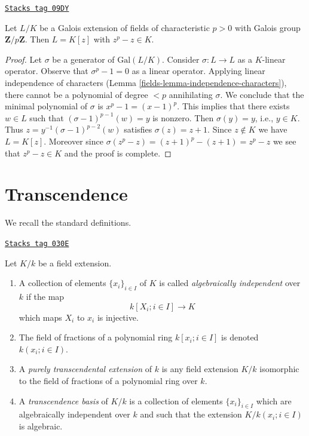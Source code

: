 \begin{lemma}

\label{fields-lemma-Artin-Schreier}
\href{https://stacks.math.columbia.edu/tag/09DY}{\texttt{Stacks tag 09DY}}

Let $L/K$ be a Galois extension of fields of characteristic $p > 0$
with Galois group $\mathbf{Z}/p\mathbf{Z}$. Then $L = K[z]$ with
$z^p - z \in K$.
\end{lemma}

\begin{proof}

Let $\sigma$ be a generator of $\text{Gal}(L/K)$.
Consider $\sigma : L \to L$ as a $K$-linear operator.
Observe that $\sigma^p - 1 = 0$ as a linear operator.
Applying linear independence of characters
(Lemma \ref{fields-lemma-independence-characters}),
there cannot be a polynomial of degree $< p$
annihilating $\sigma$. We conclude that the minimal
polynomial of $\sigma$ is $x^p - 1 = (x - 1)^p$.
This implies that there exists $w \in L$ such that
$(\sigma - 1)^{p - 1}(w) = y$ is nonzero. Then
$\sigma(y) = y$, i.e., $y \in K$. Thus
$z = y^{-1}(\sigma - 1)^{p - 2}(w)$ satisfies
$\sigma(z) = z + 1$. Since $z \not \in K$ we have $L = K[z]$.
Moreover since $\sigma(z^p - z) = (z + 1)^p - (z + 1) = z^p - z$
we see that $z^p - z \in K$ and the proof is complete.
\end{proof}

\section{Transcendence}
\label{fields-section-transcendence}
We recall the standard definitions.

\begin{definition}[Transcendence]
\label{fields-definition-transcendence}
\href{https://stacks.math.columbia.edu/tag/030E}{\texttt{Stacks tag 030E}}

Let $K/k$ be a field extension.
\begin{enumerate}
\item A collection of elements $\{x_i\}_{i \in I}$ of $K$ is called
{\it algebraically independent} over $k$ if the map
$$
k[X_i; i\in I] \longrightarrow K
$$
which maps $X_i$ to $x_i$ is injective.
\item The field of fractions of a polynomial ring
$k[x_i; i \in I]$ is denoted $k(x_i; i\in I)$.
\item A {\it purely transcendental extension} of $k$ is any
field extension $K/k$ isomorphic to the field of
fractions of a polynomial ring over $k$.
\item A {\it transcendence basis} of $K/k$ is a
collection of elements $\{x_i\}_{i \in I}$ which are
algebraically independent over $k$ and such that
the extension $K/k(x_i; i\in I)$ is algebraic.
\end{enumerate}
\end{definition}

